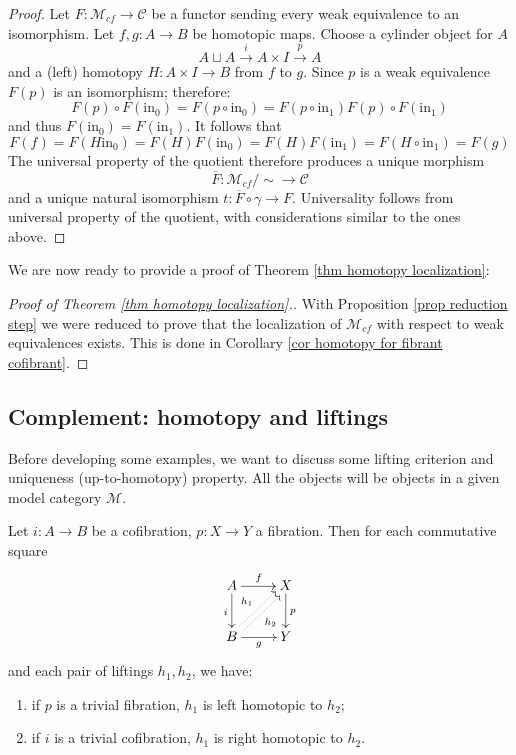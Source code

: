 \begin{refsection}
\begin{proof}
Let $F \colon \mathcal M_{cf} \to \mathcal C$ be a functor sending every weak equivalence to an isomorphism. Let $f,g \colon A \to B$ be homotopic maps. Choose a cylinder object for $A$
\[
A \sqcup A \xrightarrow{i} A \times I \xrightarrow{p} A
\]
and a (left) homotopy $H \colon A \times I \to B$ from $f$ to $g$. Since $p$ is a weak equivalence $F(p)$ is an isomorphism; therefore:
\[
F(p) \circ F(\mathrm{in}_0) = F(p \circ \mathrm{in}_0) = F(p \circ \mathrm{in}_1) F(p) \circ F(\mathrm{in}_1)
\]
and thus $F(\mathrm{in}_0) = F(\mathrm{in}_1)$. It follows that
\[
F(f) = F(H \mathrm{in}_0) = F(H) F(\mathrm{in}_0) = F(H) F(\mathrm{in}_1) = F(H \circ \mathrm{in_1}) = F(g)
\]
The universal property of the quotient therefore produces a unique morphism
\[
\overline{F} \colon \mathcal M_{cf} / \sim \to \mathcal C
\]
and a unique natural isomorphism $t \colon \overline{F} \circ \gamma \to F$. Universality follows from universal property of the quotient, with considerations similar to the ones above.
\end{proof}

We are now ready to provide a proof of Theorem \ref{thm homotopy localization}:

\begin{proof}[Proof of Theorem \ref{thm homotopy localization}.]
With Proposition \ref{prop reduction step} we were reduced to prove that the localization of $\mathcal M_{cf}$ with respect to weak equivalences exists. This is done in Corollary \ref{cor homotopy for fibrant cofibrant}.
\end{proof}

\subsection{Complement: homotopy and liftings}

Before developing some examples, we want to discuss some lifting criterion and uniqueness (up-to-homotopy) property. All the objects will be objects in a given model category $\mathcal M$.

\begin{prop} \label{prop lifting up to homotopy}
Let $i \colon A \to B$ be a cofibration, $p \colon X \to Y$ a fibration. Then for each commutative square
\[
\xymatrix{
A \ar[d]_i \ar[r]^f & X \ar[d]^p \\ B \ar[r]_g \ar@<.5ex>@{.>}[ur]^{h_1} \ar@<-.5ex>@{.>}[ur]_{h_2} & Y
}
\]
and each pair of liftings $h_1,h_2$, we have:
\begin{enumerate}
\item if $p$ is a trivial fibration, $h_1$ is left homotopic to $h_2$;
\item if $i$ is a trivial cofibration, $h_1$ is right homotopic to $h_2$.
\end{enumerate}
\end{prop}


\end{refsection}
